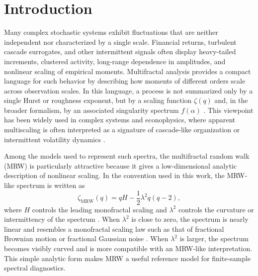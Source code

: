 \section{Introduction}

Many complex stochastic systems exhibit fluctuations that are neither
independent nor characterized by a single scale. Financial returns, turbulent
cascade surrogates, and other intermittent signals often display heavy-tailed
increments, clustered activity, long-range dependence in amplitudes, and
nonlinear scaling of empirical moments. Multifractal analysis provides a
compact language for such behavior by describing how moments of different
orders scale across observation scales. In this language, a process is not
summarized only by a single Hurst or roughness exponent, but by a scaling
function \(\zeta(q)\) and, in the broader formalism, by an associated
singularity spectrum \(f(\alpha)\)
\cite{halsey1986fractal,chhabra1989direct}. This viewpoint has been widely
used in complex systems and econophysics, where apparent multiscaling is often
interpreted as a signature of cascade-like organization or intermittent
volatility dynamics
\cite{cont2001stylized,mandelbrot1997multifractal,calvet2002multifractality,dimatteo2005long}.

Among the models used to represent such spectra, the multifractal random walk
(MRW) is particularly attractive because it gives a low-dimensional analytic
description of nonlinear scaling. In the convention used in this work, the
MRW-like spectrum is written as
\[
\zeta_{\mathrm{MRW}}(q)=qH-\frac{1}{2}\lambda^2 q(q-2),
\]
where \(H\) controls the leading monofractal scaling and \(\lambda^2\) controls
the curvature or intermittency of the spectrum
\cite{bacry2001multifractal,bacry2003log}. When \(\lambda^2\) is close to zero,
the spectrum is nearly linear and resembles a monofractal scaling law such as
that of fractional Brownian motion or fractional Gaussian noise
\cite{mandelbrot1968fractional}. When \(\lambda^2\) is larger, the spectrum
becomes visibly curved and is more compatible with an MRW-like interpretation.
This simple analytic form makes MRW a useful reference model for finite-sample
spectral diagnostics.

